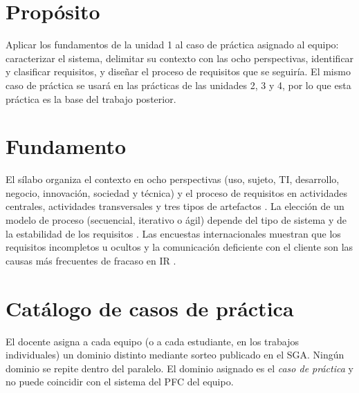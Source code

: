 \documentclass[11pt]{article}
\newcommand{\seccion}[1]{\section{\textcolor{utegreendk}{#1}}}
\begin{document}
\seccion{Propósito}

Aplicar los fundamentos de la unidad 1 al caso de práctica asignado al equipo: caracterizar el sistema, delimitar su contexto con las ocho perspectivas, identificar y clasificar requisitos, y diseñar el proceso de requisitos que se seguiría. El mismo caso de práctica se usará en las prácticas de las unidades 2, 3 y 4, por lo que esta práctica es la base del trabajo posterior.

\seccion{Fundamento}

El sílabo organiza el contexto en ocho perspectivas (uso, sujeto, TI, desarrollo, negocio, innovación, sociedad y técnica) y el proceso de requisitos en actividades centrales, actividades transversales y tres tipos de artefactos \citep{pohl_2025}. La elección de un modelo de proceso (secuencial, iterativo o ágil) depende del tipo de sistema y de la estabilidad de los requisitos \citep{swebok_v4_2024,ireb_cpre_fl_2026}. Las encuestas internacionales muestran que los requisitos incompletos u ocultos y la comunicación deficiente con el cliente son las causas más frecuentes de fracaso en IR \citep{mendez_napire_2017,wagner_statusquo_2019}.

\seccion{Catálogo de casos de práctica}

El docente asigna a cada equipo (o a cada estudiante, en los trabajos individuales) un dominio distinto mediante sorteo publicado en el SGA. Ningún dominio se repite dentro del paralelo. El dominio asignado es el \emph{caso de práctica} y no puede coincidir con el sistema del PFC del equipo.
\end{document}
